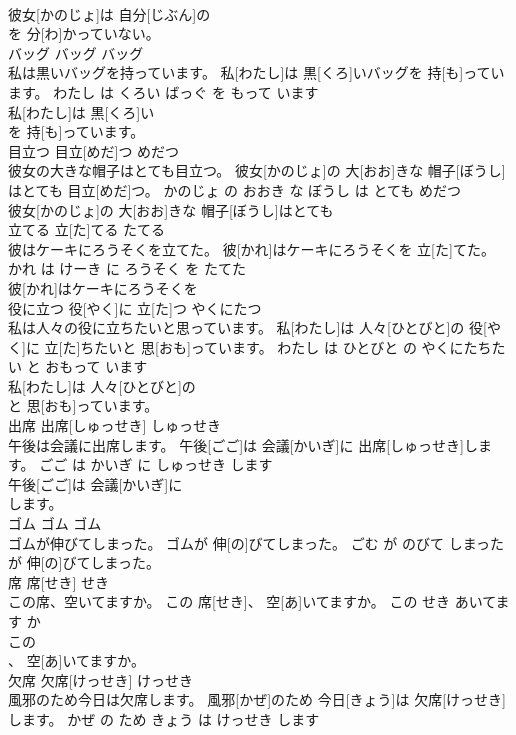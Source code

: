 \documentclass[8pt]{extreport}
\begin{document}
\begin{CJK}{UTF8}{min}
\\	彼女[かのじょ]は 自分[じぶん]の
\\	を 分[わ]かっていない。			
\\	バッグ	バッグ	バッグ	
\\	私は黒いバッグを持っています。	私[わたし]は 黒[くろ]いバッグを 持[も]っています。	わたし は くろい ばっぐ を もって います	
\\	私[わたし]は 黒[くろ]い
\\	を 持[も]っています。			
\\	目立つ	目立[めだ]つ	めだつ	
\\	彼女の大きな帽子はとても目立つ。	彼女[かのじょ]の 大[おお]きな 帽子[ぼうし]はとても 目立[めだ]つ。	かのじょ の おおき な ぼうし は とても めだつ	
\\	彼女[かのじょ]の 大[おお]きな 帽子[ぼうし]はとても
\\	立てる	立[た]てる	たてる	
\\	彼はケーキにろうそくを立てた。	彼[かれ]はケーキにろうそくを 立[た]てた。	かれ は けーき に ろうそく を たてた	
\\	彼[かれ]はケーキにろうそくを
\\	役に立つ	役[やく]に 立[た]つ	やくにたつ	
\\	私は人々の役に立ちたいと思っています。	私[わたし]は 人々[ひとびと]の 役[やく]に 立[た]ちたいと 思[おも]っています。	わたし は ひとびと の やくにたちたい と おもって います	
\\	私[わたし]は 人々[ひとびと]の
\\	と 思[おも]っています。			
\\	出席	出席[しゅっせき]	しゅっせき	
\\	午後は会議に出席します。	午後[ごご]は 会議[かいぎ]に 出席[しゅっせき]します。	ごご は かいぎ に しゅっせき します	
\\	午後[ごご]は 会議[かいぎ]に
\\	します。			
\\	ゴム	ゴム	ゴム	
\\	ゴムが伸びてしまった。	ゴムが 伸[の]びてしまった。	ごむ が のびて しまった	
\\	が 伸[の]びてしまった。			
\\	席	席[せき]	せき	
\\	この席、空いてますか。	この 席[せき]、 空[あ]いてますか。	この せき あいてます か	
\\	この
\\	、 空[あ]いてますか。			
\\	欠席	欠席[けっせき]	けっせき	
\\	風邪のため今日は欠席します。	風邪[かぜ]のため 今日[きょう]は 欠席[けっせき]します。	かぜ の ため きょう は けっせき します	

\end{CJK}
\end{document}
